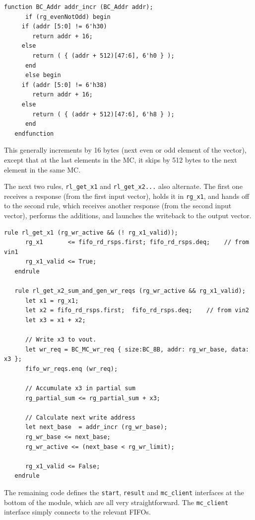 \documentclass[twoside,letterpaper,11pt]{article}
\begin{document}
\begin{Verbatim}[frame=single, label=App\_HW\_v0.bsv] 
   function BC_Addr addr_incr (BC_Addr addr);
      if (rg_evenNotOdd) begin
	 if (addr [5:0] != 6'h30)
	    return addr + 16;
	 else
	    return ( { (addr + 512)[47:6], 6'h0 } );
      end
      else begin
	 if (addr [5:0] != 6'h38)
	    return addr + 16;
	 else
	    return ( { (addr + 512)[47:6], 6'h8 } );
      end
   endfunction
\end{Verbatim}

This generally increments by 16 bytes (next even or odd element of the
vector), except that at the last elements in the MC, it skips by 512
bytes to the next element in the same MC.

The next two rules, \verb|rl_get_x1| and \verb|rl_get_x2...| also
alternate.  The first one receives a response (from the first input
vector), holds it in \verb|rg_x1|, and hands off to the second rule,
which receives another response (from the second input vector),
performs the additions, and launches the writeback to the output
vector.

\begin{Verbatim}[frame=single, label=App\_HW\_v0.bsv] 
   rule rl_get_x1 (rg_wr_active && (! rg_x1_valid));
      rg_x1       <= fifo_rd_rsps.first; fifo_rd_rsps.deq;    // from vin1
      rg_x1_valid <= True;
   endrule

   rule rl_get_x2_sum_and_gen_wr_reqs (rg_wr_active && rg_x1_valid);
      let x1 = rg_x1;
      let x2 = fifo_rd_rsps.first;  fifo_rd_rsps.deq;    // from vin2
      let x3 = x1 + x2;

      // Write x3 to vout.
      let wr_req = BC_MC_wr_req { size:BC_8B, addr: rg_wr_base, data: x3 };
      fifo_wr_reqs.enq (wr_req);

      // Accumulate x3 in partial sum
      rg_partial_sum <= rg_partial_sum + x3;

      // Calculate next write address
      let next_base  = addr_incr (rg_wr_base);
      rg_wr_base <= next_base;
      rg_wr_active <= (next_base < rg_wr_limit);

      rg_x1_valid <= False;
   endrule
\end{Verbatim}

The remaining code defines the \verb|start|, \verb|result| and
\verb|mc_client| interfaces at the bottom of the module, which are all
very straightforward.  The \verb|mc_client| interface simply connects
to the relevant FIFOs.

\end{document}
